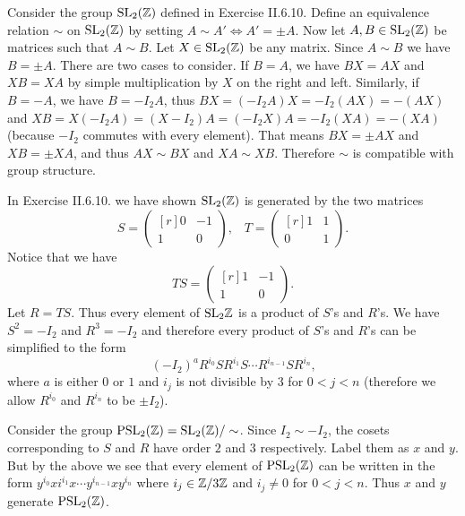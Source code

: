 \begin{solution}
	Consider the group $\mathrm{SL}_2(\mathbb{Z})$ defined in Exercise II.6.10. Define an equivalence relation $\sim$ on $\mathrm{SL}_2(\mathbb{Z})$ by setting $A \sim A' \Longleftrightarrow A' = \pm A$. Now let $A, B \in \mathrm{SL}_2(\mathbb{Z})$ be matrices such that $A \sim B$. Let $X \in \mathrm{SL}_2(\mathbb{Z})$ be any matrix. Since $A \sim B$ we have $B = \pm A$. There are two cases to consider. If $B = A$, we have $B X = A X$ and $X B = X A$ by simple multiplication by $X$ on the right and left. Similarly, if $B = -A$, we have $B = -I_2 A$, thus $B X = (-I_2 A) X = -I_2 (A X) = -(A X)$ and $X B = X (-I_2 A) = (X -I_2) A = (-I_2 X) A = -I_2 (X A) = -(X A)$ (because $-I_2$ commutes with every element). That means $B X = \pm A X$ and $X B = \pm X A$, and thus $A X \sim B X$ and $X A \sim X B$. Therefore $\sim$ is compatible with group structure.
	
	In Exercise II.6.10. we have shown $\mathrm{SL}_2(\mathbb{Z})$ is generated by the two matrices
	\[
	S =
	\begin{pmatrix*}[r]
		0 & -1 \\
		1  & 0
	\end{pmatrix*}
	\text{,}\quad
	T =
	\begin{pmatrix*}[r]
		1 & 1 \\
		0 & 1
	\end{pmatrix*}
	\text{.}
	\]
	Notice that we have
	\[
	T S =
	\begin{pmatrix*}[r]
		1 & -1 \\
		1 & 0
	\end{pmatrix*}
	\text{.}
	\]
	Let $R = TS$. Thus every element of $\mathrm{SL}_2{\mathbb{Z}}$ is a product of $S$'s and $R$'s. We have $S^2 = -I_2$ and $R^3 = -I_2$ and therefore every product of $S$'s and $R$'s can be simplified to the form
	\[
	(-I_2)^a R^{i_0} S R^{i_1} S \cdots R^{i_{n-1}} S R^{i_n} \text{,}
	\]
	where $a$ is either $0$ or $1$ and $i_j$ is not divisible by 3 for $0 < j < n$ (therefore we allow $R^{i_0}$ and $R^{i_n}$ to be $\pm I_2$).
	
	Consider the group $\mathrm{PSL}_2(\mathbb{Z}) = \mathrm{SL}_2(\mathbb{Z})/\sim$. Since $I_2 \sim -I_2$, the cosets corresponding to $S$ and $R$ have order $2$ and $3$ respectively. Label them as $x$ and $y$. But by the above we see that every element of $\mathrm{PSL}_2(\mathbb{Z})$ can be written in the form $y^{i_0} x i^{i_1} x \cdots y^{i_{n-1}} x y^{i_n}$ where $i_j \in \mathbb{Z}/3\mathbb{Z}$ and $i_j \neq 0$ for $0 < j < n$. Thus $x$ and $y$ generate $\mathrm{PSL}_2(\mathbb{Z})$.
\end{solution}

\begin{problem}
\end{problem}

